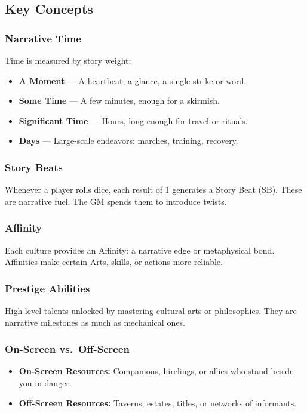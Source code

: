 \subsection{Key Concepts}

\subsubsection{Narrative Time}
Time is measured by story weight:
\begin{itemize}
  \item \textbf{A Moment} --- A heartbeat, a glance, a single strike or word.
  \item \textbf{Some Time} --- A few minutes, enough for a skirmish.
  \item \textbf{Significant Time} --- Hours, long enough for travel or rituals.
  \item \textbf{Days} --- Large-scale endeavors: marches, training, recovery.
\end{itemize}

\subsubsection{Story Beats}
Whenever a player rolls dice, each result of 1 generates a Story Beat (SB). These are narrative fuel. The GM spends them to introduce twists.

\subsubsection{Affinity}
Each culture provides an Affinity: a narrative edge or metaphysical bond. Affinities make certain Arts, skills, or actions more reliable.

\subsubsection{Prestige Abilities}
High-level talents unlocked by mastering cultural arts or philosophies. They are narrative milestones as much as mechanical ones.

\subsubsection{On-Screen vs.\ Off-Screen}
\begin{itemize}
  \item \textbf{On-Screen Resources:} Companions, hirelings, or allies who stand beside you in danger.
  \item \textbf{Off-Screen Resources:} Taverns, estates, titles, or networks of informants.
\end{itemize}
